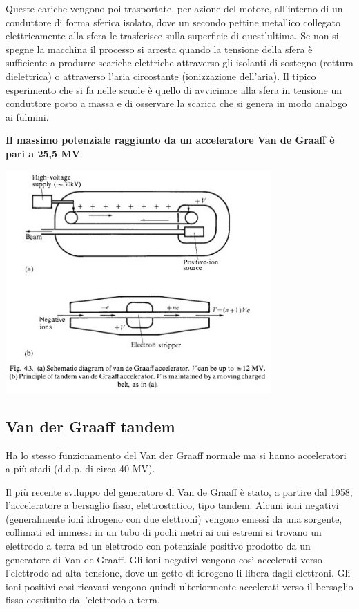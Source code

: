 \documentclass[a4paper,11pt,twoside,openany]{book}
\theoremstyle{definition}
\theoremstyle{plain}
\theoremstyle{plain}
\theoremstyle{definition}
\begin{document}
Queste cariche vengono poi trasportate, per azione del motore, all'interno di un conduttore di forma sferica isolato, dove un secondo pettine metallico collegato elettricamente alla sfera le trasferisce sulla superficie di quest'ultima. Se non si spegne la macchina il processo si arresta quando la tensione della sfera è sufficiente a produrre scariche elettriche attraverso gli isolanti di sostegno (rottura dielettrica) o attraverso l'aria circostante (ionizzazione dell'aria). Il tipico esperimento che si fa nelle scuole è quello di avvicinare alla sfera in tensione un conduttore posto a massa e di osservare la scarica che si genera in modo analogo ai fulmini.

\textbf{Il massimo potenziale raggiunto da un acceleratore Van de Graaff è pari a 25,5 MV}.

\begin{center}
\includegraphics[width=4in]{immagini/acc_potential.jpg} %
\end{center}

\subsection{Van der Graaff tandem} %
Ha lo stesso funzionamento del Van der Graaff normale ma si hanno acceleratori a più stadi (d.d.p. di circa 40 MV).

Il più recente sviluppo del generatore di Van de Graaff è stato, a partire dal 1958, l'acceleratore a bersaglio fisso, elettrostatico, tipo tandem. Alcuni ioni negativi (generalmente ioni idrogeno con due elettroni) vengono emessi da una sorgente, collimati ed immessi in un tubo di pochi metri ai cui estremi si trovano un elettrodo a terra ed un elettrodo con potenziale positivo prodotto da un generatore di Van de Graaff. Gli ioni negativi vengono così accelerati verso l'elettrodo ad alta tensione, dove un getto di idrogeno li libera dagli elettroni. Gli ioni positivi così ricavati vengono quindi ulteriormente accelerati verso il bersaglio fisso costituito dall'elettrodo a terra.
\end{document}
